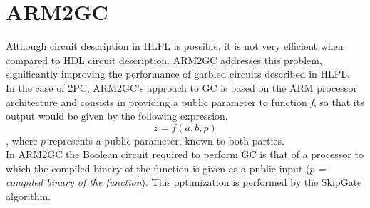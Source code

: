 \section{ARM2GC}
Although circuit description in HLPL is possible, it is not very efficient when compared to HDL circuit description. ARM2GC addresses this problem, significantly improving the performance of garbled circuits described in HLPL.\\
In the case of 2PC, ARM2GC's approach to GC is based on the ARM processor architecture and consists in providing a public parameter to function \textit{f}, so that its output would be given by the following expression,
\begin{equation}\label{eq:arm2gc}
z = f(a,b,p)
\end{equation}
, where $p$ represents a public parameter, known to both parties.\\
In ARM2GC the Boolean circuit required to perform GC is that of a processor to which the compiled binary of the function is given as a public input ($p$\textit{ = compiled binary of the function}). This optimization is performed by the SkipGate algorithm.

 
